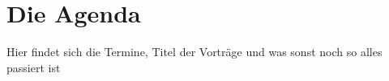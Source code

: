 \chapter*{Die Agenda}
Hier findet sich die Termine, Titel der Vorträge und was sonst noch so alles passiert ist